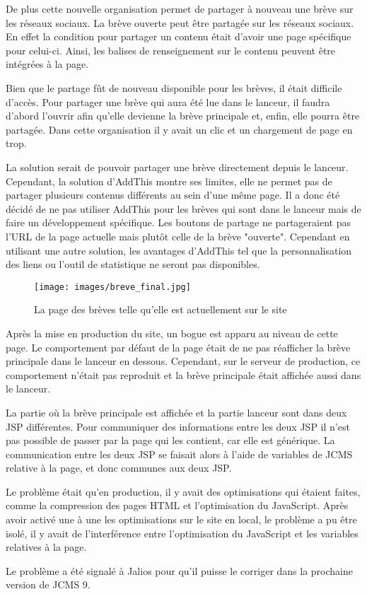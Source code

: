 \documentclass[12pt,a4paper]{article}
\begin{document}
De plus cette nouvelle organisation permet de partager à nouveau une brève sur les réseaux sociaux. La brève ouverte peut être partagée sur les réseaux sociaux. En effet la condition pour partager un contenu était d'avoir une page spécifique pour celui-ci. Ainsi, les balises de renseignement sur le contenu peuvent être intégrées à la page.\par 
Bien que le partage fût de nouveau disponible pour les brèves, il était difficile d'accès. Pour partager une brève qui aura été lue dans le lanceur, il faudra d'abord l'ouvrir afin qu'elle devienne la brève principale et, enfin, elle pourra être partagée. Dans cette organisation il y avait un clic et un chargement de page en trop.\par 
La solution serait de pouvoir partager une brève directement depuis le lanceur. Cependant, la solution d'AddThis montre ses limites, elle ne permet pas de partager plusieurs contenus différents au sein d'une même page. Il a donc été décidé de ne pas utiliser AddThis pour les brèves qui sont dans le lanceur mais de faire un développement spécifique. Les boutons de partage ne partageraient pas l'URL de la page actuelle mais plutôt celle de la brève "ouverte". Cependant en utilisant une autre solution, les avantages d'AddThis tel que la personnalisation des liens ou l'outil de statistique ne seront pas disponibles.\par

\begin{figure}[h!]
\centering\texttt{[image: images/breve\_final.jpg]} 
\caption{La page des brèves telle qu'elle est actuellement sur le site}
\end{figure}

\newpage
Après la mise en production du site, un bogue est apparu au niveau de cette page. Le comportement par défaut de la page était de ne pas réafficher la brève principale dans le lanceur en dessous. Cependant, sur le serveur de production, ce comportement n'était pas reproduit et la brève principale était affichée aussi dans le lanceur.\par 
La partie où la brève principale est affichée et la partie lanceur sont dans deux JSP différentes. Pour communiquer des informations entre les deux JSP il n'est pas possible de passer par la page qui les contient, car elle est générique. La communication entre les deux JSP se faisait alors à l'aide de variables de \gls{JCMS} relative à la page, et donc communes aux deux JSP.\par 
Le problème était qu'en production, il y avait des optimisations qui étaient faites, comme la compression des pages \gls{HTML} et l'optimisation du JavaScript. Après avoir activé une à une les optimisations sur le site en local, le problème a pu être isolé, il y avait de l'interférence entre l'optimisation du JavaScript et les variables relatives à la page.\par 
Le problème a été signalé à Jalios pour qu'il puisse le corriger dans la prochaine version de \gls{JCMS} 9.\par
\end{document}
